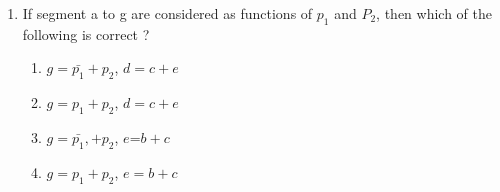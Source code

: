 \documentclass[12pt,-letter paper]{article}
\begin{document}
\begin{enumerate}

	\item If segment a to g are considered as functions of $p_1$  and $P_2$, then which of the following is correct ?

		\begin{enumerate}[label=(\Alph*)]
\item $g=\bar{p_1}+p_2$, $d=c+e$
\item $g=p_1+p_2$, $d=c+e$
\item $g=\bar{p_1},+p_2$, $e$=$b+c$
\item $g=p_1+p_2$, $e=b+c$
\end{enumerate}
\end{enumerate}
\end{document}
